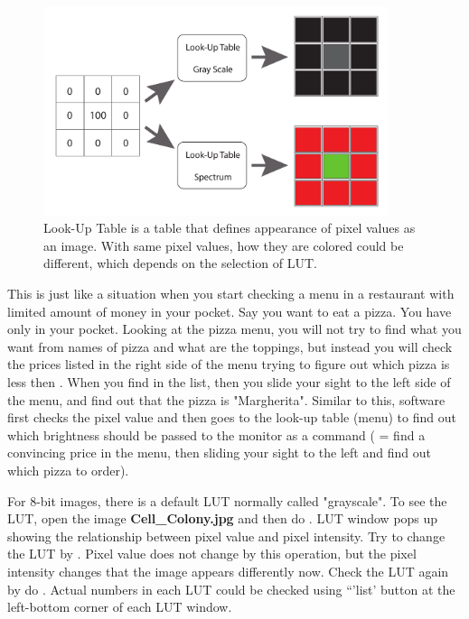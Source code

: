 \begin{figure}[h!]
\begin{center}
\includegraphics[width=0.9\textwidth]{fig/LUT.pdf}
\caption{Look-Up Table is a table that defines appearance of pixel values as an image. With same pixel values, how they are colored could be different, which depends on the selection of LUT. }
\label{fig:lutscheme}
\end{center}
\end{figure}

This is just like a situation when you start checking a menu in a
restaurant with limited amount of money in your pocket. Say you want to
eat a pizza. You have only  in your pocket. Looking at the
pizza menu, you will not try to find what you want from names of pizza
and what are the toppings, but instead you will check the prices listed
in the right side of the menu trying to figure out which pizza is less
then . When you find  in the list, then you slide your
sight to the left side of the menu, and find out that the pizza is
"Margherita". Similar to this,
software first checks the pixel value and then goes to the look-up
table (menu) to find out which brightness should be passed to the
monitor as a command ( = find a convincing price in the menu, then
sliding your sight to the left and find out which pizza to order).



\begin{indentexercise}{1}
For 8-bit images, there is a default LUT normally called "grayscale". 
To see the LUT, open the image \textbf{Cell\_Colony.jpg} and then 
do . LUT window pops up showing 
the relationship between pixel value and pixel intensity. 
Try to change the LUT by . 
Pixel value does not change by this operation, but the pixel intensity changes 
that the image appears differently now. Check the LUT again by do . 
Actual numbers in each LUT could be checked using ``'list' button at the left-bottom corner of each LUT window. 
\end{indentexercise}


